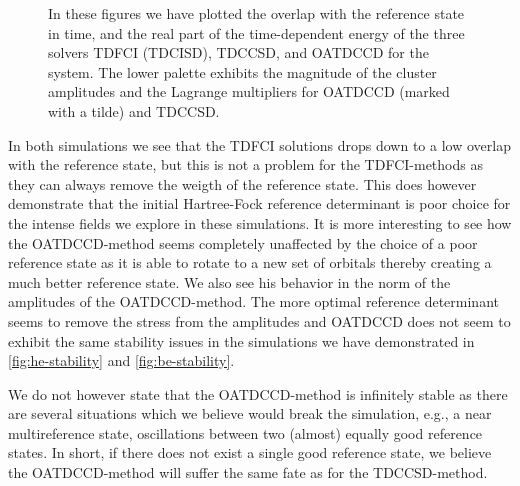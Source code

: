 \begin{figure}
            \caption{In these figures we have plotted the overlap with the
            reference state in time, and the real part of the time-dependent
            energy of the three solvers TDFCI (TDCISD), TDCCSD, and OATDCCD for
            the  system.
            The lower palette exhibits the magnitude of the cluster amplitudes
            and the Lagrange multipliers for OATDCCD (marked with a tilde) and
            TDCCSD.}
            \label{fig:be-stability}
        \end{figure}
        In both simulations we see that the TDFCI solutions drops down to a low
        overlap with the reference state, but this is not a problem for the
        TDFCI-methods as they can always remove the weigth of the reference
        state.
        This does however demonstrate that the initial Hartree-Fock reference
        determinant is poor choice for the intense fields we explore in these
        simulations.
        It is more interesting to see how the OATDCCD-method seems completely
        unaffected by the choice of a poor reference state as it is able to
        rotate to a new set of orbitals thereby creating a much better reference
        state.
        We also see his behavior in the norm of the amplitudes of the
        OATDCCD-method.
        The more optimal reference determinant seems to remove the stress from
        the amplitudes and OATDCCD does not seem to exhibit the same stability
        issues in the simulations we have demonstrated in
        \autoref{fig:he-stability} and \autoref{fig:be-stability}.

        We do not however state that the OATDCCD-method is infinitely stable as
        there are several situations which we believe would break the
        simulation, e.g., a near multireference state, oscillations between two
        (almost) equally good reference states.
        In short, if there does not exist a single good reference state, we
        believe the OATDCCD-method will suffer the same fate as for the
        TDCCSD-method.


